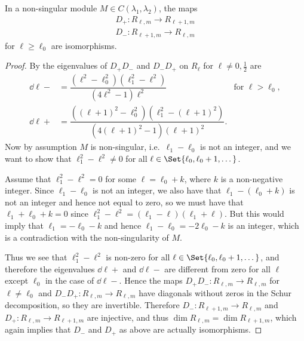 \begin{lemma}\label{lem:Disos}
  In a non-singular module $M\in C(\lambda_1,\lambda_2)$, the maps
  \begin{align*}
    D_+\colon R_{\ell,m} \to R_{\ell+1,m} \\
    D_-\colon R_{\ell+1,m} \to R_{\ell,m}
  \end{align*}
  for $\ell\geq \ell_0$ are isomorphisms. 
\end{lemma}
\begin{proof}
  By  the eigenvalues of $D_+D_-$ and $D_-D_+$ on $R_\ell$ for $\ell\neq 0,\tfrac{1}{2}$ are
  \begin{align*}
    \dd{\ell}{-} &= \dfrac{(\ell^2-\ell_0^2)(\ell_1^2-\ell^2)}{(4\ell^2-1)\ell^2} & \mbox{for }\ell>\ell_0,\\
    \dd{\ell}{+} &= \dfrac{((\ell+1)^2-\ell_0^2)(\ell_1^2-(\ell+1)^2)}{(4(\ell+1)^2-1)(\ell+1)^2}.
  \end{align*}
  Now by assumption $M$ is non-singular, i.e.\ $\ell_1-\ell_0$ is not an integer, and we want to show that $\ell_1^2-\ell^2\neq 0$ for all $\ell\in \Set{\ell_0,\ell_0+1,\dotsc}$.

  Assume that $\ell_1^2-\ell^2=0$ for some $\ell=\ell_0+k$, where $k$ is a non-negative integer. Since $\ell_1-\ell_0$ is not an integer, we also have that $\ell_1-(\ell_0+k)$ is not an integer and hence not equal to zero, so we must have that $\ell_1+\ell_0+k=0$ since $\ell_1^2-\ell^2=(\ell_1-\ell)(\ell_1+\ell)$. But this would imply that $\ell_1=-\ell_0-k$ and hence $\ell_1-\ell_0=-2\ell_0-k$ is an integer, which is a contradiction with the non-singularity of $M$.

  Thus we see that $\ell_1^2-\ell^2$ is non-zero for all $\ell\in \Set{\ell_0,\ell_0+1,\dotsc}$, and therefore the eigenvalues $\dd{\ell}{+}$ and $\dd{\ell}{-}$ are different from zero for all $\ell$ except $\ell_0$ in the case of $\dd{\ell}{-}$. Hence the maps $D_+D_-\colon R_{\ell,m}\to R_{\ell,m}$ for $\ell\neq\ell_0$ and $D_-D_+\colon R_{\ell,m}\to R_{\ell,m}$ have diagonals without zeros in the Schur decomposition, so they are invertible. Therefore $D_-\colon R_{\ell+1,m}\to R_{\ell,m}$ and $D_+\colon R_{\ell,m}\to R_{\ell+1,m}$ are injective, and thus $\dim R_{\ell,m} = \dim R_{\ell+1,m}$, which again implies that $D_-$ and $D_+$ as above are actually isomorphisms.
\end{proof}

